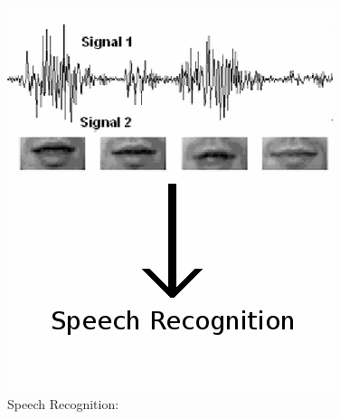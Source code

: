 \documentclass{beamer}
\begin{document}
\begin{frame}
\begin{figure}
\begin{minipage}[b]{0.38\linewidth}
      \includegraphics[width=\textwidth]{./Images/SpeechRecognitioncopy.png}
      \caption{Speech Recognition: \cite{Dactu2007}}
    \end{minipage}
    \hfill
  \end{figure}
\end{frame}

\end{document}
